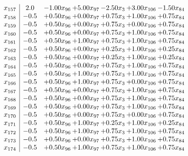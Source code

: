 \documentclass[8pt]{article}
\begin{document}
\[\begin{array}{c| c c@{\hskip 2pt} c@{\hskip 2pt} c@{\hskip 2pt} c@{\hskip 2pt} c@{\hskip 2pt} }
 x_{157}   &  2.0 & -1.00 x_{96} & +  5.00 x_{97} & -2.50 x_{3} & +  3.00 x_{106} & -1.50 x_{84}\\
 x_{158}   &  -0.5 & +  0.50 x_{96} & +  0.00 x_{97} & +  0.75 x_{3} & +  1.00 x_{106} & +  0.75 x_{84}\\
 x_{159}   &  -0.5 & +  0.50 x_{96} & +  0.00 x_{97} & +  0.75 x_{3} & +  0.00 x_{106} & +  0.75 x_{84}\\
 x_{160}   &  -0.5 & +  0.50 x_{96} & +  0.00 x_{97} & +  0.75 x_{3} & +  1.00 x_{106} & +  0.75 x_{84}\\
 x_{161}   &  -0.5 & +  0.50 x_{96} & +  1.00 x_{97} & +  0.75 x_{3} & +  1.00 x_{106} & +  0.75 x_{84}\\
 x_{162}   &  -0.5 & +  0.50 x_{96} & +  0.00 x_{97} & +  0.25 x_{3} & +  1.00 x_{106} & +  0.25 x_{84}\\
 x_{163}   &  -0.5 & +  0.50 x_{96} & +  0.00 x_{97} & +  0.25 x_{3} & +  1.00 x_{106} & +  0.25 x_{84}\\
 x_{164}   &  -0.5 & +  0.50 x_{96} & +  0.00 x_{97} & +  0.75 x_{3} & +  1.00 x_{106} & +  0.75 x_{84}\\
 x_{165}   &  -0.5 & +  0.50 x_{96} & +  1.00 x_{97} & +  0.75 x_{3} & +  1.00 x_{106} & +  0.75 x_{84}\\
 x_{166}   &  -0.5 & +  0.50 x_{96} & +  1.00 x_{97} & +  0.75 x_{3} & +  0.00 x_{106} & +  0.75 x_{84}\\
 x_{167}   &  -0.5 & +  0.50 x_{96} & +  0.00 x_{97} & +  0.75 x_{3} & +  1.00 x_{106} & +  0.75 x_{84}\\
 x_{168}   &  -0.5 & +  0.50 x_{96} & +  0.00 x_{97} & +  0.75 x_{3} & +  1.00 x_{106} & +  0.75 x_{84}\\
 x_{169}   &  -0.5 & +  0.50 x_{96} & +  0.00 x_{97} & +  0.75 x_{3} & +  1.00 x_{106} & +  0.75 x_{84}\\
 x_{170}   &  -0.5 & +  0.50 x_{96} & +  0.00 x_{97} & +  0.75 x_{3} & +  0.00 x_{106} & +  0.75 x_{84}\\
 x_{171}   &  -0.5 & +  0.50 x_{96} & +  1.00 x_{97} & +  0.25 x_{3} & +  1.00 x_{106} & +  0.25 x_{84}\\
 x_{172}   &  -0.5 & +  0.50 x_{96} & +  1.00 x_{97} & +  0.75 x_{3} & +  1.00 x_{106} & +  0.75 x_{84}\\
 x_{173}   &  -0.5 & +  0.50 x_{96} & +  0.00 x_{97} & +  0.75 x_{3} & +  1.00 x_{106} & +  0.75 x_{84}\\
 x_{174}   &  -0.5 & +  0.50 x_{96} & +  1.00 x_{97} & +  0.75 x_{3} & +  1.00 x_{106} & +  0.75 x_{84}\\

\end{array}\]
\end{document}
